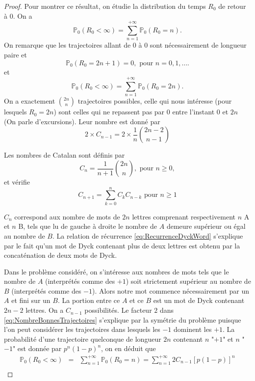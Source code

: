 \begin{proof}
Pour montrer ce résultat, on étudie la distribution du temps $R_0$ de retour à $0$. On a
$$
\mathbb{P}_0(R_0<\infty)=\sum_{n=1}^{+\infty}\mathbb{P}_0(R_0=n).
$$
On remarque que les trajectoires allant de $0$ à $0$ sont nécessairement de longueur paire et
$$
\mathbb{P}_0(R_0=2n+1)=0,\text{ pour } n=0,1,\ldots.
$$
et
$$
\mathbb{P}_0(R_0<\infty)=\sum_{n=1}^{+\infty}\mathbb{P}_0(R_0=2n).
$$
On a exactement $\binom{2n}{n}$ trajectoires possibles, celle qui nous intéresse (pour lesquels $R_0=2n$) sont celles qui ne repassent pas par $0$ entre l'instant $0$ et $2n$ (On parle d'excursions). Leur nombre est donné par
\begin{equation}\label{eq:NombreBonnesTrajectoires}
2\times C_{n-1}=2\times \frac{1}{n}\binom{2n-2}{n-1}
\end{equation}
\begin{definition}
Les nombres de Catalan sont définis par
$$
C_n=\frac{1}{n+1}\binom{2n}{n},\text{ pour }n\geq 0,
$$
et vérifie
\begin{equation}\label{eq:RecurrenceDyckWord}
C_{n+1}=\sum_{k=0}^{n}C_kC_{n-k}\text{ pour }n\geq1
\end{equation}
\end{definition}
\begin{ex}
$C_n$ correspond aux nombre de mots de $2n$ lettres comprenant respectivement $n$ A et $n$ B, tels que lu de gauche à droite le nombre de $A$ demeure supérieur ou égal au nombre de $B$. La relation de récurrence \eqref{eq:RecurrenceDyckWord} s'explique par le fait qu'un mot de Dyck contenant plus de deux lettres est obtenu par la concaténation de deux mots de Dyck.
\end{ex}
Dans le problème considéré, on s'intéresse aux nombres de mots tels que le nombre de $A$ (interprétés comme des $+1$) soit strictement supérieur au nombre de $B$ (interprétés comme des $-1$). Alors notre mot commence nécessairement par un $A$ et fini sur un $B$. La portion entre ce $A$ et ce $B$ est un mot de Dyck contenant $2n-2$ lettres. On a $C_{n-1}$ possibilités. Le facteur $2$ dans \eqref{eq:NombreBonnesTrajectoires} s'explique par la symétrie du problème puisque l'on peut considérer les trajectoires dans lesquels les $-1$ dominent les $+1$. La probabilité d'une trajectoire quelconque de longueur $2n$ contenant $n$ "$+1$" et $n$ "$-1$" est donnée par $p^{n}(1-p)^{n}$, on en déduit que
\begin{eqnarray}
\mathbb{P}_0(R_0<\infty)&=&\sum_{n=1}^{+\infty}\mathbb{P}_0(R_0=n)=\sum_{n=1}^{+\infty}2C_{n-1}[p(1-p)]^{n}\nonumber\\

\end{eqnarray}
\end{proof}
